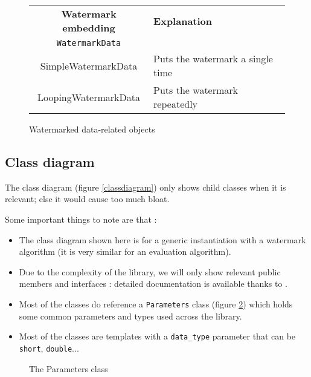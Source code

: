 \begin{figure}[h!]
\centering
\begin{tabular}{|c|l|}
\hline
\textbf{Watermark embedding} & \textbf{Explanation} \\
\texttt{WatermarkData} & \\
\hline
SimpleWatermarkData & Puts the watermark a single time \\   
LoopingWatermarkData & Puts the watermark repeatedly \\
\hline
\end{tabular}
\caption{Watermarked data-related objects}
\label{frameworkclass4}
\end{figure}

\newpage

\subsection{Class diagram}

The class diagram (figure \ref{classdiagram}) only shows child classes when it is relevant; else it would cause too much bloat.

Some important things to note are that :
\begin{itemize}
\item The class diagram shown here is for a generic instantiation with a watermark algorithm (it is very similar for an evaluation algorithm). 
\item Due to the complexity of the library, we will only show relevant public members and interfaces : detailed documentation is available thanks to .
\item Most of the classes do reference a \texttt{Parameters} class (figure \ref{parametersclass}) which holds some common parameters and types used across the library.
\item Most of the classes are templates with a \texttt{data\_type} parameter that can be \texttt{short}, \texttt{double}...
\end{itemize}


\begin{figure}[h!]
\centering
{}

\caption{The Parameters class}
\label{parametersclass}
\end{figure}

